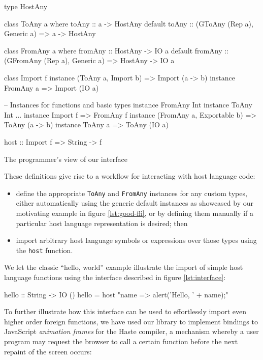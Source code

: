\documentclass[preprint]{sigplanconf}
\begin{document}
\begin{listingfloat}
\begin{code}
  type HostAny

  class ToAny a where
    toAny :: a -> HostAny
    default toAny :: (GToAny (Rep a), Generic a)
                  => a -> HostAny

  class FromAny a where
    fromAny :: HostAny -> IO a
    default fromAny :: (GFromAny (Rep a), Generic a)
                  => HostAny -> IO a

  class Import f
  instance (ToAny a, Import b) => Import (a -> b)
  instance FromAny a           => Import (IO a)

  -- Instances for functions and basic types
  instance FromAny Int
  instance ToAny Int
  ...
  instance Import f => FromAny f
  instance (FromAny a, Exportable b) => ToAny (a -> b)
  instance ToAny a => ToAny (IO a)

  host :: Import f => String -> f
\end{code}
\caption{The programmer's view of our interface}
\label{lst:interface}
\end{listingfloat}

These definitions give rise to a workflow for interacting with host
language code:
\begin{itemize}
\item
  define the appropriate \lstinline!ToAny! and \lstinline!FromAny! instances
  for any custom types, either automatically using the generic default instances
  as showcased by our motivating example in figure \ref{lst:good-ffi},
  or by defining them manually if a particular host language representation is
  desired; then
\item
  import arbitrary host language symbols or expressions over
  those types using the \lstinline!host! function.
\end{itemize}

We let the classic ``hello, world'' example illustrate the import of simple
host language functions using the interface described in figure
\ref{lst:interface}:

\begin{code}
  hello :: String -> IO ()
  hello = host "name => {alert('Hello, ' + name);}"
\end{code}

To further illustrate how this interface can be used to effortlessly import
even higher order foreign functions, we have used our library to
implement bindings to JavaScript \emph{animation frames} for the Haste
compiler, a mechanism whereby a user program may request the browser to call
a certain function before the next repaint of the screen occurs:
\end{document}
